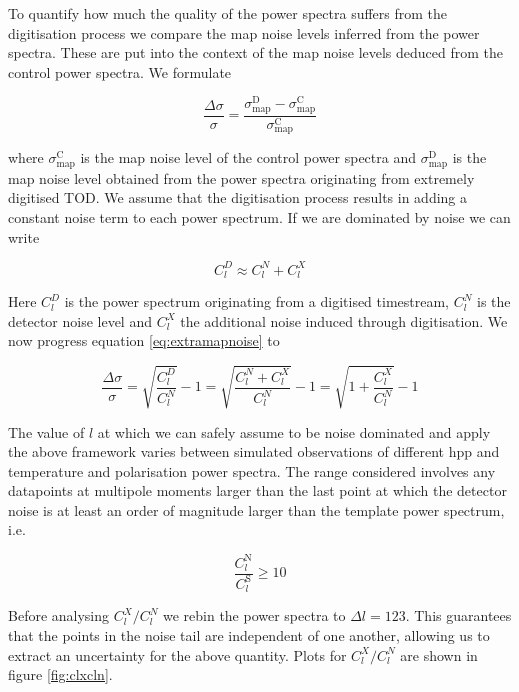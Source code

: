 \documentclass[apj]{emulateapj}
\begin{document}
To quantify how much the quality of the power spectra suffers from the digitisation process we compare the map noise levels inferred from the power spectra. These are put into the context of the map noise levels deduced from the control power spectra. We formulate

\begin{equation} \label{eq:extramapnoise}
\frac{\Delta \sigma}{\sigma} = \frac{\sigma_{\mathrm{map}}^{\mathrm{D}}-\sigma_{\mathrm{map}}^{\mathrm{C}}}{\sigma_{\mathrm{map}}^{\mathrm{C}}}
\end{equation}

where $\sigma_{\mathrm{map}}^{\mathrm{C}}$ is the map noise level of the control power spectra and $\sigma_{\mathrm{map}}^{\mathrm{D}}$ is the map noise level obtained from the power spectra originating from extremely digitised TOD. We assume that the digitisation process results in adding a constant noise term to each power spectrum. If we are dominated by noise we can write

\[ C_l^D \approx C_l^N + C_l^X \]

Here $C_l^D$ is the power spectrum originating from a digitised timestream, $C_l^N$ is the detector noise level and $C_l^X$ the additional noise induced through digitisation. We now progress equation \ref{eq:extramapnoise} to

\[\frac{\Delta \sigma}{\sigma} = \sqrt{\frac{C_l^D}{C_l^{N}}} - 1  = \sqrt{\frac{C_l^N + C_l^X}{C_l^{N}}} - 1 = \sqrt{1 + \frac{C_l^X}{C_l^{N}}} - 1  \]

The value of $l$ at which we can safely assume to be noise dominated and apply the above framework varies between simulated observations of different hpp and temperature and polarisation power spectra. The range considered involves any datapoints at multipole moments larger than the last point at which the detector noise is at least an order of magnitude larger than the template power spectrum, i.e.

\[ \frac{C_l^{\mathrm{N}}}{C_l^{\mathrm{S}}} \geq 10 \]

Before analysing $C_l^X/C_l^N$ we rebin the power spectra to $\Delta l = 123$. This guarantees that the points in the noise tail are independent of one another, allowing us to extract an uncertainty for the above quantity. Plots for $C_l^X/C_l^N$ are shown in figure \ref{fig:clxcln}.
\end{document}
